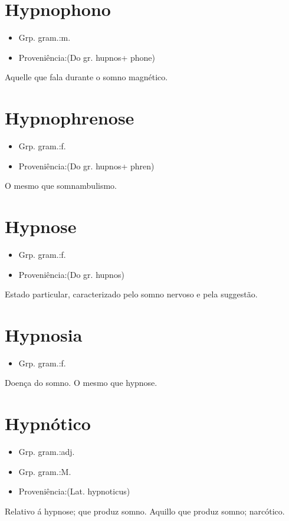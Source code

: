 \documentclass{article}
\begin{document}
\section{Hypnophono}
\begin{itemize}
\item {Grp. gram.:m.}
\end{itemize}
\begin{itemize}
\item {Proveniência:(Do gr. \textunderscore hupnos\textunderscore  + \textunderscore phone\textunderscore )}
\end{itemize}
Aquelle que fala durante o somno magnético.
\section{Hypnophrenose}
\begin{itemize}
\item {Grp. gram.:f.}
\end{itemize}
\begin{itemize}
\item {Proveniência:(Do gr. \textunderscore hupnos\textunderscore  + \textunderscore phren\textunderscore )}
\end{itemize}
O mesmo que \textunderscore somnambulismo\textunderscore .
\section{Hypnose}
\begin{itemize}
\item {Grp. gram.:f.}
\end{itemize}
\begin{itemize}
\item {Proveniência:(Do gr. \textunderscore hupnos\textunderscore )}
\end{itemize}
Estado particular, caracterizado pelo somno nervoso e pela suggestão.
\section{Hypnosia}
\begin{itemize}
\item {Grp. gram.:f.}
\end{itemize}
Doença do somno.
O mesmo que \textunderscore hypnose\textunderscore .
\section{Hypnótico}
\begin{itemize}
\item {Grp. gram.:adj.}
\end{itemize}
\begin{itemize}
\item {Grp. gram.:M.}
\end{itemize}
\begin{itemize}
\item {Proveniência:(Lat. \textunderscore hypnoticus\textunderscore )}
\end{itemize}
Relativo á hypnose; que produz somno.
Aquillo que produz somno; narcótico.
\end{document}
